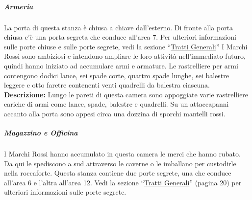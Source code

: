 \documentclass{article}
\begin{document}
        \subparagraph{Armeria} La porta di questa stanza è chiusa a chiave dall’esterno. Di
    fronte alla porta chiusa c'è una porta segreta che conduce
    all'area 7. Per ulteriori informazioni sulle porte chiuse e sulle
    porte segrete, vedi la sezione “\hyperlink{trattigen}{Tratti Generali}” I Marchi Rossi sono ambiziosi e intendono ampliare le loro
    attività nell'immediato futuro, quindi hanno iniziato ad
    accumulare armi e armature.
    Le rastrelliere per armi contengono dodici lance, sei spade
    corte, quattro spade lunghe, sei balestre leggere e otto faretre
    contenenti venti quadrelli da balestra ciascuna.\\
        
        \textbf{Descrizione:} Lungo le pareti di questa camera sono appoggiate varie
    rastrelliere cariche di armi come lance, spade, balestre e
    quadrelli. Su un attaccapanni accanto alla porta sono appesi
    circa una dozzina di sporchi mantelli rossi.

    \subparagraph{Magazzino e Officina} I Marchi Rossi hanno accumulato in questa camera le merci
    che hanno rubato. Da qui le spediscono a sud attraverso le
    caverne o le imballano per custodirle nella roccaforte. Questa stanza contiene due porte segrete, una che conduce
    all’area 6 e l’altra all'area 12. Vedi la sezione “\hyperlink{trattigen}{Tratti Generali}”
    (pagina 20) per ulteriori informazioni sulle porte segrete.\\
\end{document}
